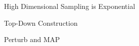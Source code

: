 \begin{frame}{High Dimensional Sampling is Exponential}

\end{frame}

\begin{frame}{Top-Down Construction}
\end{frame}

\begin{frame}{Perturb and MAP}
\end{frame}
